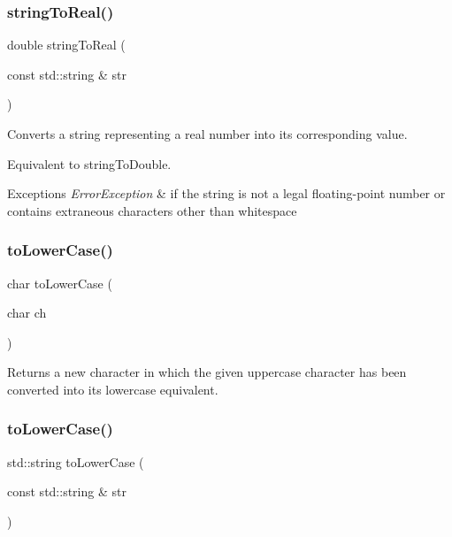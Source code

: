 \subsubsection{\texorpdfstring{string\+To\+Real()}{stringToReal()}}
{\footnotesize\ttfamily double string\+To\+Real (\begin{DoxyParamCaption}\item[{const std\+::string \&}]{str }\end{DoxyParamCaption})}



Converts a string representing a real number into its corresponding value. 

Equivalent to string\+To\+Double. 
\begin{DoxyExceptions}{Exceptions}
{\em Error\+Exception} & if the string is not a legal floating-\/point number or contains extraneous characters other than whitespace \\
\hline
\end{DoxyExceptions}
\mbox{\label{namespacesgl_1_1priv_1_1strlib_acad0624097ac17da5bda04d41c1363f7}} 
\subsubsection{\texorpdfstring{to\+Lower\+Case()}{toLowerCase()}\hspace{0.1cm}{\footnotesize\ttfamily [1/2]}}
{\footnotesize\ttfamily char to\+Lower\+Case (\begin{DoxyParamCaption}\item[{char}]{ch }\end{DoxyParamCaption})}



Returns a new character in which the given uppercase character has been converted into its lowercase equivalent. 

\mbox{\label{namespacesgl_1_1priv_1_1strlib_ad8200839a864ebdf2f129fbffa33967b}} 
\subsubsection{\texorpdfstring{to\+Lower\+Case()}{toLowerCase()}\hspace{0.1cm}{\footnotesize\ttfamily [2/2]}}
{\footnotesize\ttfamily std\+::string to\+Lower\+Case (\begin{DoxyParamCaption}\item[{const std\+::string \&}]{str }\end{DoxyParamCaption})}



